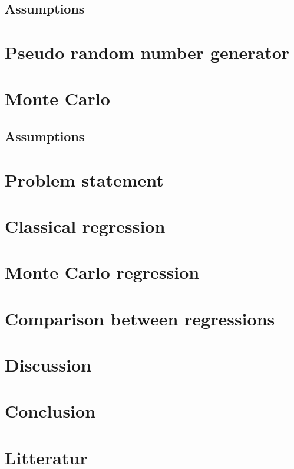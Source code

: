 \documentclass{article}
\begin{document}
	\subsection{Assumptions}
	\newpage
	\section{Pseudo random number generator}
	\newpage
	\section{Monte Carlo}
	\subsection{Assumptions}
	\newpage
	\section{Problem statement}
	\newpage
	\section{Classical regression}
 	
	\newpage
	\section{Monte Carlo regression}
	\newpage
	\section{Comparison between regressions}
	\newpage
	\section{Discussion}
	\newpage
	\section{Conclusion}
	\newpage
 	\section{Litteratur}
  
\end{document}

